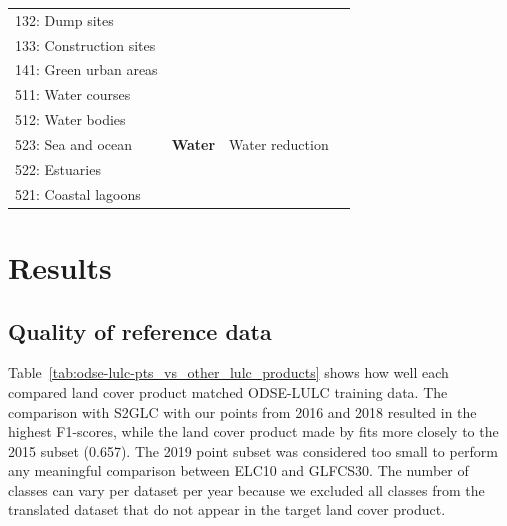 \begin{landscape}
\begin{table}[!hp]
{\begin{tabular}{@{}|l|l|l|l|l|l|l|l|l|@{}}
    132: Dump sites &  &  & \multicolumn{4}{l|}{} &  &  \\
    133: Construction sites &  &  & \multicolumn{4}{l|}{} &  &  \\
    141: Green urban areas &  &  & \multicolumn{4}{l|}{} &  &  \\ \midrule
    511: Water courses & \multirow{5}{*}{\textbf{Water}} & \multicolumn{6}{l|}{\multirow{5}{*}{Water reduction}} & \multirow{5}{*}{} \\
    512: Water bodies &  & \multicolumn{6}{l|}{} &  \\
    523: Sea and ocean &  & \multicolumn{6}{l|}{} &  \\
    522: Estuaries &  & \multicolumn{6}{l|}{} &  \\
    521: Coastal lagoons &  & \multicolumn{6}{l|}{} &  \\ \bottomrule
    \end{tabular}%
    }
    \end{table}
    \end{landscape}

\section{Results}

\subsection*{Quality of reference data}

    Table\@~\ref{tab:odse-lulc-pts_vs_other_lulc_products} shows how well each compared land cover product matched  ODSE-LULC training data. The comparison with S2GLC with our points from 2016 and 2018 resulted in the highest F1-scores, while the land cover product made by \citet{pflugmacher2019mapping} fits more closely to the 2015 subset (0.657). The 2019 point subset was considered too small to perform any meaningful comparison between  ELC10 and GLFCS30. The number of classes can vary per dataset per year because we excluded all classes from the translated dataset that do not appear in the target land cover product.
    
